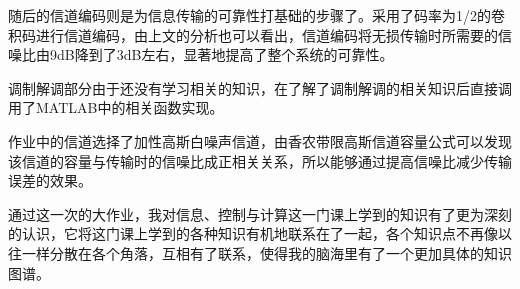 \documentclass{../source/zju}
\begin{document}
    随后的信道编码则是为信息传输的可靠性打基础的步骤了。采用了码率为1/2的卷积码进行信道编码，由上文的分析也可以看出，信道编码将无损传输时所需要的信噪比由9dB降到了3dB左右，显著地提高了整个系统的可靠性。

    调制解调部分由于还没有学习相关的知识，在了解了调制解调的相关知识后直接调用了MATLAB中的相关函数实现。

    作业中的信道选择了加性高斯白噪声信道，由香农带限高斯信道容量公式可以发现该信道的容量与传输时的信噪比成正相关关系，所以能够通过提高信噪比减少传输误差的效果。

    通过这一次的大作业，我对信息、控制与计算这一门课上学到的知识有了更为深刻的认识，它将这门课上学到的各种知识有机地联系在了一起，各个知识点不再像以往一样分散在各个角落，互相有了联系，使得我的脑海里有了一个更加具体的知识图谱。
\end{document}
